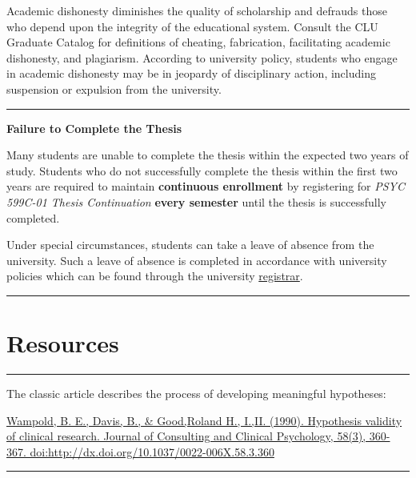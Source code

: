 \documentclass[
  openany]{book}
\begin{document}
Academic dishonesty diminishes the quality of scholarship and defrauds those who depend upon the integrity of the educational system. Consult the CLU Graduate Catalog for definitions of cheating, fabrication, facilitating academic dishonesty, and plagiarism. According to university policy, students who engage in academic dishonesty may be in jeopardy of disciplinary action, including suspension or expulsion from the university.

\begin{center}\rule{0.5\linewidth}{0.5pt}\end{center}

\textbf{Failure to Complete the Thesis}

Many students are unable to complete the thesis within the expected two years of study. Students who do not successfully complete the thesis within the first two years are required to maintain \textbf{continuous enrollment} by registering for \emph{PSYC 599C-01 Thesis Continuation} \textbf{every semester} until the thesis is successfully completed.

Under special circumstances, students can take a leave of absence from the university. Such a leave of absence is completed in accordance with university policies which can be found through the university \href{https://www.callutheran.edu/students/registrar/}{registrar}.

\begin{center}\rule{0.5\linewidth}{0.5pt}\end{center}

\hypertarget{resources}{%
\chapter{Resources}\label{resources}}

\begin{center}\rule{0.5\linewidth}{0.5pt}\end{center}

The classic article describes the process of developing meaningful hypotheses:

\href{https://ezproxy.callutheran.edu/login?url=https://search-proquest-com.ezproxy.callutheran.edu/docview/210630433?accountid=9839}{Wampold, B. E., Davis, B., \& Good,Roland H., I.,II. (1990). Hypothesis validity of clinical research. Journal of Consulting and Clinical Psychology, 58(3), 360-367. doi:http://dx.doi.org/10.1037/0022-006X.58.3.360}

\begin{center}\rule{0.5\linewidth}{0.5pt}\end{center}
\end{document}

